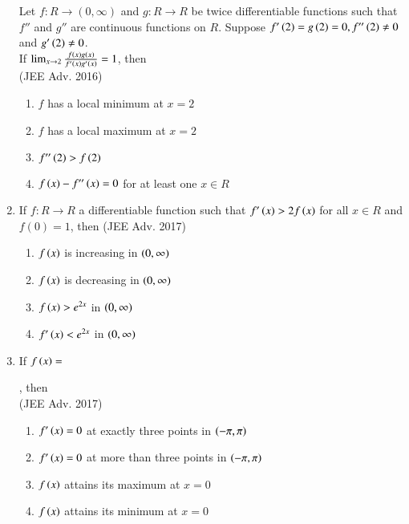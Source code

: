 \documentclass[journal]{IEEEtran}
\begin{document}
\begin{enumerate}
{    %
            Let $f: R\rightarrow (0,\infty)$ and $g: R\rightarrow R$ be twice differentiable functions such that $f''$ and $g''$ are continuous functions on $R$. Suppose $f'\left(2\right) = g\left(2\right)=0, f''\left(2\right) \neq0$ and $g'\left(2\right)\neq0$.\\[6pt] If $\lim_{x\to2}  \frac{f\left(x\right)g\left(x\right)}{f'\left(x\right)g'\left(x\right)} = 1$, then \\
             \text{  }\hfill
                {(JEE Adv. 2016)}
            \begin{multicols}{2}
                \begin{enumerate}
                    \item $f$ has a local minimum at $x=2$
                    \item $f$ has a local maximum at $x=2$
                    \item $f''\left(2\right)>f\left(2\right)$
                    \item $f\left(x\right) - f''\left(x\right) = 0$ for at least one $x\in R$
                \end{enumerate}
            \end{multicols}
        
        }
    \item{
        
            If $f: R\rightarrow R$ a differentiable function such that $f'\left(x\right)>2f\left(x\right)$ for all $x \in R$ and $f(0) = 1$, then
             \text{   }\hfill
                {(JEE Adv. 2017)}
            \begin{multicols}{2}
                \begin{enumerate}
                    \item $f\left(x\right)$ is increasing in $\left(0,\infty\right)$
                    \item $f\left(x\right)$ is decreasing in $\left(0,\infty\right)$
                    \item $f\left(x\right)>e^{2x}$ in $\left(0,\infty\right)$
                    \item $f'\left(x\right)<e^{2x}$ in $\left(0,\infty\right)$
                \end{enumerate}
            \end{multicols}
        
        }
    \item{
        
            If $f\left(x\right) = $
            
            , then \\
            \text{   } \hfill
                {(JEE Adv. 2017)}
            \begin{enumerate}
                    \item $f'\left(x\right) = 0$ at exactly three points in $\left(-\pi,\pi\right)$
                    \item $f'\left(x\right) = 0$ at more than three points in $\left(-\pi,\pi\right)$
                    \item $f\left(x\right)$ attains its maximum at $x=0$
                    \item $f\left(x\right)$ attains its minimum at $x=0$
            \end{enumerate}
        
}
\end{enumerate}
\end{document}
